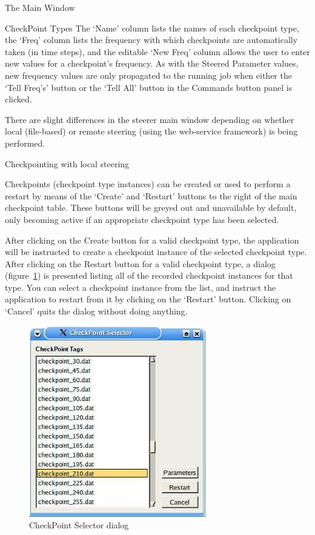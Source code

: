 \documentclass[a4paper,twoside]{article}
\begin{document}
\begin{section}{The Main Window}
\begin{subsection}{CheckPoint Types}
The `Name' column lists the names of each checkpoint type, the `Freq'
column lists the frequency with which checkpoints are automatically
taken (in time steps), and the editable `New Freq' column allows the user
to enter new values for a checkpoint's frequency. As with the Steered
Parameter values, new frequency values are only propagated to the
running job when either the `Tell Freq's' button or the `Tell All'
button in the Commands button panel is clicked.

There are slight differences in the steerer main window depending on
whether local (file-based) or remote steering (using the web-service
framework) is being performed.


\begin{subsubsection}{Checkpointing with local steering}

Checkpoints (checkpoint type instances) can be created or used to
perform a restart by means of the `Create' and `Restart' buttons to
the right of the main checkpoint table. These buttons will be greyed
out and unavailable by default, only becoming active if an appropriate
checkpoint type has been selected.

After clicking on the Create button for a valid checkpoint type, the
application will be instructed to create a checkpoint instance of the
selected checkpoint type.  After clicking on the Restart button for a
valid checkpoint type, a dialog (figure~\ref{fig:chk_list_dialog}) is
presented listing all of the recorded checkpoint instances for that
type. You can select a checkpoint instance from the list, and instruct
the application to restart from it by clicking on the `Restart'
button. Clicking on `Cancel' quits the dialog without doing anything.

\begin{figure}
\centerline{\includegraphics{chk_list.png}}
\caption{CheckPoint Selector dialog}
\label{fig:chk_list_dialog}
\end{figure}


\end{subsubsection}
\end{subsection}
\end{section}
\end{document}

